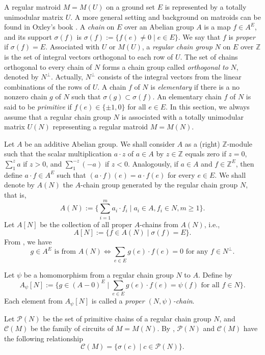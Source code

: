 \documentclass[12pt]{article}%
\numberwithin{equation}{section}
\begin{document}
A regular matroid $M=M(U)$ on a ground set $E$ is represented by a totally unimodular matrix $U$. A more general setting and background on matroids can be found in Oxley's book \cite{Oxley2011}. A {\em chain} on $E$ over an Abelian group $A$ is a map $f\in A^E$, and its support $\sigma(f)$ is $\sigma(f):=\{f(e)\ne 0\mid e\in E\}$. We say that $f$ is {\em proper} if $\sigma(f)=E$.  Associated with $U$ or $M(U)$, a {\em regular chain group} $N$ on $E$ over $\mathbb{Z}$ is the set of integral vectors orthogonal to each row of $U$. The set of chains orthogonal to every chain of $N$ forms a chain group called {\em orthogonal to} $N$, denoted by $N^\perp$. Actually, $N^\perp$ consists of  the integral vectors from the linear combinations of the rows of $U$. A chain $f$ of $N$ is {\em elementary} if there is a no nonzero chain $g$ of $N$ such that $\sigma(g)\subset \sigma(f)$. An elementary chain $f$ of $N$ is said to be {\em primitive} if  $f(e)\in\{\pm1,0\}$ for all $e\in E$. In this section, we always assume that a regular chain group $N$ is associated with a totally unimodular matrix $U(N)$ representing a regular matroid $M=M(N)$.

Let $A$ be an additive Abelian group. We shall consider $A$ as a (right) $\mathbb{Z}$-module such that the scalar multiplication $a\cdot z$ of $a\in A$ by $z\in\mathbb{Z}$ equals zero if $z=0$, $\sum_1^za$ if $z>0$, and $\sum_1^{-z}(-a)$ if $z<0$. Analogously, if $a\in A$ and $f\in \mathbb{Z}^E$, then define $a\cdot f\in A^E$ such that $(a\cdot f)(e)=a\cdot f(e)$ for every $e\in E$. We shall denote by $A(N)$ the $A$-chain group generated by the regular chain group $N$, that is,
\[
A(N):=\Big\{\sum_{i=1}^ma_i\cdot f_i\mid a_i\in A,f_i\in N,m\ge 1\Big\}.
\]
Let $A[N]$ be the collection of all proper $A$-chains from $A(N)$, i.e.,
\[
A[N]:=\big\{f\in A(N)\mid \sigma(f)=E\big\}.
\]
From \cite[Proposition 1]{Arrowsmith-Jaeger1982}, we have
\begin{equation}\label{Regular-Chain-Element}
g\in A^E\text{ is from } A(N)\Longleftrightarrow \sum_{e\in E}g(e)\cdot f(e)=0 \text{ for any } f\in N^\perp.
\end{equation}

Let $\psi$ be a homomorphism from a regular chain group $N$ to $A$.  Define by 
\[
A_\psi[N]:=\Big\{g\in (A-0)^E\mid \sum_{e\in E}g(e)\cdot f(e)=\psi(f) \text{ for all } f\in N\Big\}.
\]
Each element from $A_\psi[N]$ is called a {\em proper $(N,\psi)$-chain}.

Let $\mathcal{P}(N)$ be the set of primitive chains of a regular chain group $N$, and $\mathcal{C}(M)$ be the family of circuits of $M=M(N)$. By \cite{Tutte1956}, $\mathcal{P}(N)$ and $\mathcal{C}(M)$ have the following relationship
\begin{equation}\label{Primitive-Circuit}
\mathcal{C}(M)=\big\{\sigma(c)\mid c\in\mathcal{P}(N)\big\}.
\end{equation}
\end{document}
